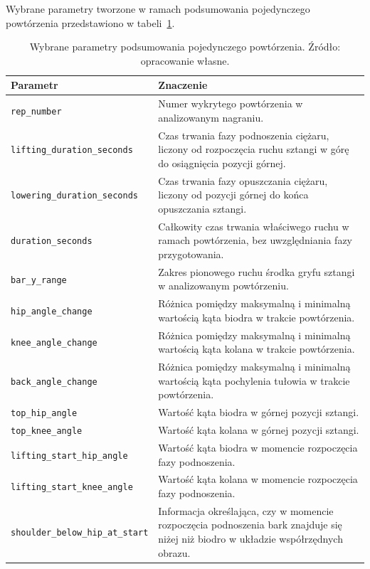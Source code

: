 Wybrane parametry tworzone w ramach podsumowania pojedynczego powtórzenia przedstawiono w tabeli~\ref{tab:parametry-podsumowania-powtorzenia}.

\begin{table}[H]
\centering
\caption{Wybrane parametry podsumowania pojedynczego powtórzenia. Źródło: opracowanie własne.}
\label{tab:parametry-podsumowania-powtorzenia}
\vspace{0.3cm}
\small
\begin{tabular}{p{5.6cm}p{8.4cm}}
\toprule
\addlinespace[0.3em]
\textbf{Parametr} & \textbf{Znaczenie} \\
\midrule
\texttt{rep\_number} & Numer wykrytego powtórzenia w analizowanym nagraniu. \\

\texttt{lifting\_duration\_seconds} & Czas trwania fazy podnoszenia ciężaru, liczony od rozpoczęcia ruchu sztangi w górę do osiągnięcia pozycji górnej. \\

\texttt{lowering\_duration\_seconds} & Czas trwania fazy opuszczania ciężaru, liczony od pozycji górnej do końca opuszczania sztangi. \\

\texttt{duration\_seconds} & Całkowity czas trwania właściwego ruchu w ramach powtórzenia, bez uwzględniania fazy przygotowania. \\

\texttt{bar\_y\_range} & Zakres pionowego ruchu środka gryfu sztangi w analizowanym powtórzeniu. \\

\texttt{hip\_angle\_change} & Różnica pomiędzy maksymalną i minimalną wartością kąta biodra w trakcie powtórzenia. \\

\texttt{knee\_angle\_change} & Różnica pomiędzy maksymalną i minimalną wartością kąta kolana w trakcie powtórzenia. \\

\texttt{back\_angle\_change} & Różnica pomiędzy maksymalną i minimalną wartością kąta pochylenia tułowia w trakcie powtórzenia. \\

\texttt{top\_hip\_angle} & Wartość kąta biodra w górnej pozycji sztangi. \\

\texttt{top\_knee\_angle} & Wartość kąta kolana w górnej pozycji sztangi. \\

\texttt{lifting\_start\_hip\_angle} & Wartość kąta biodra w momencie rozpoczęcia fazy podnoszenia. \\

\texttt{lifting\_start\_knee\_angle} & Wartość kąta kolana w momencie rozpoczęcia fazy podnoszenia. \\

\texttt{shoulder\_below\_hip\_at\_start} & Informacja określająca, czy w momencie rozpoczęcia podnoszenia bark znajduje się niżej niż biodro w układzie współrzędnych obrazu. \\
\bottomrule
\end{tabular}
\end{table}

